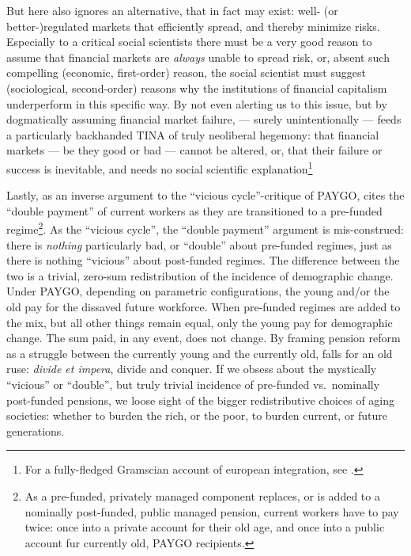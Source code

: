 \begin{enumerate}
	But \citeauthor{Cerami2009a} here also ignores an alternative, that in fact may exist: well- (or better-)regulated markets that efficiently spread, and thereby minimize risks. Especially to a critical social scientists there must be a very good reason to assume that financial markets are \emph{always} unable to spread risk, or, absent such compelling (economic, first-order) reason, the social scientist must suggest (sociological, second-order) reasons why the institutions of financial capitalism underperform in this specific way. By not even alerting us to this issue, but by dogmatically assuming financial market failure, \citeauthor{Cerami2009a} --- surely unintentionally --- feeds a particularly backhanded TINA of truly neoliberal hegemony: that financial markets --- be they good or bad --- cannot be altered, or, that their failure or success is inevitable, and needs no social scientific explanation\footnote{
		For a fully-fledged Gramscian account of european integration, see \cite{Bieler2002,Bieler2003,Bieler2005}.}

	Lastly, as an inverse argument to the ``vicious cycle''-critique of PAYGO, \citeauthor{Cerami2009a} cites the ``double payment'' of current workers as they are transitioned to a pre-funded regime\footnote{
		As a pre-funded, privately managed component replaces, or is added to a nominally post-funded, public managed pension, current workers have to pay twice: once into a private account for their old age, and once into a public account fur currently old, PAYGO recipients.}.
	As the ``vicious cycle'', the ``double payment'' argument is mis-construed: there is \emph{nothing} particularly bad, or ``double'' about pre-funded regimes, just as there is nothing ``vicious'' about post-funded regimes. The difference between the two is a trivial, zero-sum redistribution of the incidence of demographic change. Under PAYGO, depending on parametric configurations, the young and/or the old pay for the dissaved future workforce. When pre-funded regimes are added to the mix, but all other things remain equal, only the young pay for demographic change. The sum paid, in any event, does not change. By framing pension reform as a struggle between the currently young and the currently old, \citeauthor{Cerami2009a} falls for an old ruse: \emph{divide et impera}, divide and conquer. If we obsess about the mystically ``vicious'' or ``double'', but truly trivial incidence of pre-funded vs.\ nominally post-funded pensions, we loose sight of the bigger redistributive choices of aging societies: whether to burden the rich, or the poor, to burden current, or future generations.
\end{enumerate}


